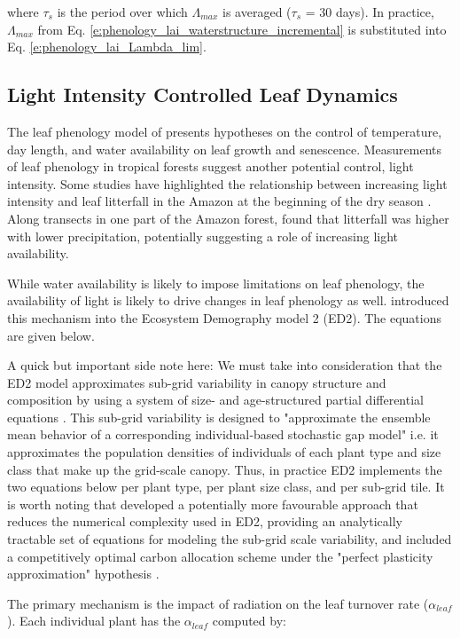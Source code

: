 \documentclass[twoside,10pt]{report}
\begin{document}
where $\tau_s$ is the period over which $\Lambda_{max}$ is averaged ($\tau_s$ = 30 days). In practice, $\Lambda_{max}$ from Eq. \ref{e:phenology_lai_waterstructure_incremental} is substituted into Eq. \ref{e:phenology_lai_Lambda_lim}. 


\subsection{Light Intensity Controlled Leaf Dynamics}

The leaf phenology model of \citet{Knorr2010} presents hypotheses on the control of temperature, day length, and water availability on leaf growth and senescence. Measurements of leaf phenology in tropical forests suggest another potential control, light intensity. Some studies have highlighted the relationship between increasing light intensity and leaf litterfall in the Amazon at the beginning of the dry season \citep{}. Along transects in one part of the Amazon forest, \citet{Rice2004} found that litterfall was higher with lower precipitation, potentially suggesting a role of increasing light availability. 

While water availability is likely to impose limitations on leaf phenology, the availability of light is likely to drive changes in leaf phenology as well. \citet{Kim2012} introduced this mechanism into the Ecosystem Demography model 2 (ED2). The equations are given below. 

A quick but important side note here: We must take into consideration that the ED2 model approximates sub-grid variability in canopy structure and composition by using a system of size- and age-structured partial differential equations \citep{Medvigy2009}. This sub-grid variability is designed to "approximate the ensemble mean behavior of a corresponding individual‐based stochastic gap model" \citep{Medvigy2009} i.e. it approximates the population densities of individuals of each plant type and size class that make up the grid-scale canopy. Thus, in practice ED2 implements the two equations below per plant type, per plant size class, and per sub-grid tile. It is worth noting that \citet{Weng2015} developed a potentially more favourable approach that reduces the numerical complexity used in ED2, providing an analytically tractable set of equations for modeling the sub-grid scale variability, and included a competitively optimal carbon allocation scheme under the "perfect plasticity approximation" hypothesis \citet{Franklin2020}. 

The primary mechanism is the impact of radiation on the leaf turnover rate ($\alpha_{leaf}$). Each individual plant has the $\alpha_{leaf}$ computed by:
\end{document}
